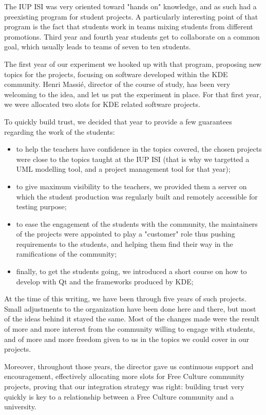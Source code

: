 The IUP ISI was very oriented toward "hands on" knowledge, and as such had a
preexisting program for student projects. A particularly interesting point of
that program is the fact that students work in teams mixing students from
different promotions. Third year and fourth year students get to collaborate on
a common goal, which usually leads to teams of seven to ten students.

The first year of our experiment we hooked up with that program, proposing new
topics for the projects, focusing on software developed within the KDE
community. Henri Massié, director of the course of study, has been very
welcoming to the idea, and let us put the experiment in place. For that first
year, we were allocated two slots for KDE related software projects.

To quickly build trust, we decided that year to provide a few guarantees
regarding the work of the students:
\begin{itemize}
  \item to help the teachers have confidence in the topics covered, the chosen
projects were close to the topics taught at the IUP ISI (that is why we
targetted a UML modelling tool, and a project management tool for that year);
  \item to give maximum visibility to the teachers, we provided them a server on
which the student production was regularly built and remotely accessible for
testing purpose;
  \item to ease the engagement of the students with the community, the
maintainers of the projects were appointed to play a "customer" role thus
pushing requirements to the students, and helping them find their way in the
ramifications of the community;
  \item finally, to get the students going, we introduced a short course on how
to develop with Qt and the frameworks produced by KDE;
\end{itemize}

At the time of this writing, we have been through five years of such projects.
Small adjustments to the organization have been done here and there, but most of
the ideas behind it stayed the same. Most of the changes made were the result of
more and more interest from the community willing to engage with students, and
of more and more freedom given to us in the topics we could cover in our
projects.

Moreover, throughout those years, the director gave us continuous support and
encouragement, effectively allocating more slots for Free Culture community
projects, proving that our integration strategy was right: building trust very
quickly is key to a relationship between a Free Culture community and a
university.

